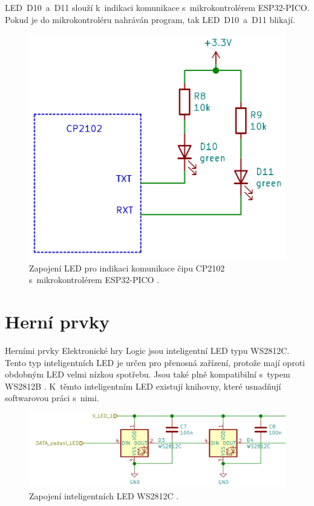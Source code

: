   LED~D10~a~D11 slouží k~indikaci komunikace s~mikrokontrolérem ESP32-PICO. Pokud je do mikrokontroléru nahráván program, tak LED~D10~a~D11 
  blikají.

  \begin{figure}[!h]
      \begin{center}
        \includegraphics[scale=0.35]{obrazky/CP2102_LED.png}
      \end{center}
      \caption[Zapojení LED pro indikaci komunikace čipu CP2102 s~mikrokontrolérem ESP32-PICO \cite{CP2102_datasheet}]{Zapojení LED pro indikaci 
      komunikace čipu CP2102 s~mikrokontrolérem ESP32-PICO \cite{CP2102_datasheet}.}
  \end{figure}

  \newpage
  \section{Herní prvky}
  Herními prvky Elektronické hry Logic jsou inteligentní LED typu WS2812C. Tento typ inteligentních LED je určen pro přenosná 
  zařízení, protože mají oproti obdobným LED velmi nízkou spotřebu. Jsou také plně kompatibilní s~typem WS2812B \cite{WS2812C_datasheet}. K~těmto 
  inteligentním LED existují knihovny, které usnadňují softwarovou práci s~nimi.

  \begin{figure}[!h]
    \begin{center}
      \includegraphics[scale=0.5]{obrazky/2_LED_WS2812C.png}
    \end{center}
    \caption[Zapojení inteligentních LED WS2812C \cite{WS2812C_datasheet}]{Zapojení inteligentních LED WS2812C \cite{WS2812C_datasheet}.}
  \end{figure}

